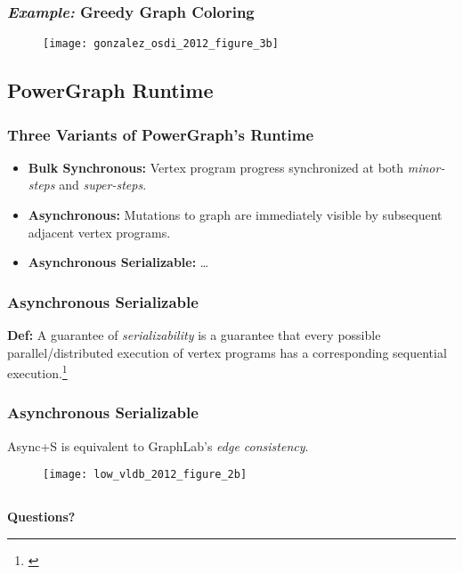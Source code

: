 \begin{frame}
  \frametitle{\textit{Example:} Greedy Graph Coloring}
  \begin{figure}
    \centering
    \texttt{[image: gonzalez\_osdi\_2012\_figure\_3b]}
    \caption{\cite[OSDI '12]{gonzalez2012powergraph}}
  \end{figure}
\end{frame}


\subsection{PowerGraph Runtime}

\begin{frame}
  \frametitle{Three Variants of PowerGraph's Runtime}
  \begin{itemize}
    \item \textbf{Bulk Synchronous:} Vertex program progress synchronized at
          both \textit{minor-steps} and \textit{super-steps}.
    \item \textbf{Asynchronous:} Mutations to graph are immediately visible by
          subsequent adjacent vertex programs.
    \item \textbf{Asynchronous Serializable:} \ldots
  \end{itemize}
\end{frame}

\begin{frame}
  \frametitle{Asynchronous Serializable}
  \textbf{Def:} A guarantee of \textit{serializability} is a guarantee that
    every possible parallel/distributed execution of vertex programs has a
    corresponding sequential execution.\footnote{\cite[OSDI '12]{gonzalez2012powergraph}}
\end{frame}

\begin{frame}
  \frametitle{Asynchronous Serializable}
  \centering
  Async+S is equivalent to GraphLab's \textit{edge consistency}.
  \begin{figure}
    \texttt{[image: low\_vldb\_2012\_figure\_2b]}
    \caption{\cite[VLDB '12]{low2012distributed}}
  \end{figure}
\end{frame}


\subsection{}

\begin{frame}
  \centering
  \textbf{\Large Questions?}
\end{frame}
